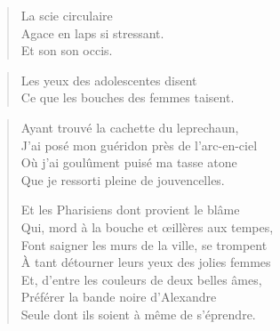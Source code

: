 \begin{verse}
La scie circulaire\\
Agace en laps si stressant.\\
Et son son occis.
\end{verse}

\begin{verse}
Les yeux des adolescentes disent\\
Ce que les bouches des femmes taisent.
\end{verse}

\begin{verse}
Ayant trouvé la cachette du leprechaun,\\
J’ai posé mon guéridon près de l’arc-en-ciel\\
Où j’ai goulûment puisé ma tasse atone\\
Que je ressorti pleine de jouvencelles.

Et les Pharisiens dont provient le blâme\\
Qui, mord à la bouche et œillères aux tempes,\\
Font saigner les murs de la ville, se trompent\\
À tant détourner leurs yeux des jolies femmes\\
Et, d’entre les couleurs de deux belles âmes,\\
Préférer la bande noire d’Alexandre\\
Seule dont ils soient à même de s'éprendre.
\end{verse}

